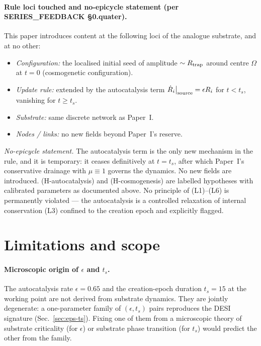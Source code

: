 \documentclass[11pt,a4paper]{article}
\begin{document}
\paragraph{Rule loci touched and no-epicycle statement (per SERIES\_FEEDBACK §0.quater).}
This paper introduces content at the following loci of the
analogue substrate, and at no other:

\begin{itemize}
\item \emph{Configuration:} the localised initial seed of amplitude $\sim R_{\rm trap}$ around centre $\Omega$ at $t=0$ (cosmogenetic configuration).
\item \emph{Update rule:} extended by the autocatalysis term $\dot R_i\big|_{\rm source} = \epsilon R_i$ for $t < t_s$, vanishing for $t \ge t_s$.
\item \emph{Substrate:} same discrete network as Paper~I.
\item \emph{Nodes / links:} no new fields beyond Paper~I's reserve.
\end{itemize}

\noindent\emph{No-epicycle statement.} The autocatalysis term is the only new mechanism in the rule, and it is temporary: it ceases definitively at $t = t_s$, after which Paper~I's conservative drainage with $\mu \equiv 1$ governs the dynamics. No new fields are introduced. (H-autocatalysis) and (H-cosmogenesis) are labelled hypotheses with calibrated parameters as documented above. No principle of (L1)--(L6) is permanently violated --- the autocatalysis is a controlled relaxation of internal conservation (L3) confined to the creation epoch and explicitly flagged.
\section{Limitations and scope}
\label{sec:not}

\paragraph{Microscopic origin of $\epsilon$ and $t_s$.}
The autocatalysis rate $\epsilon = 0.65$ and the creation-epoch
duration $t_s = 15$ at the working point are not derived from
substrate dynamics. They are jointly degenerate: a one-parameter
family of $(\epsilon, t_s)$ pairs reproduces the DESI signature
(Sec.~\ref{sec:eps-ts}). Fixing one of them from a microscopic theory
of substrate criticality (for $\epsilon$) or substrate phase
transition (for $t_s$) would predict the other from the family.
\end{document}
